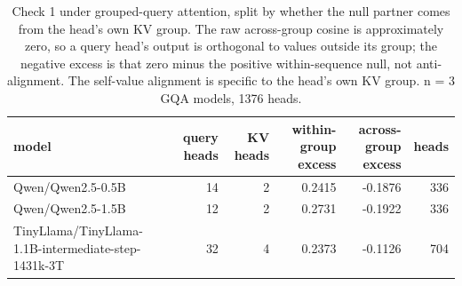 \begin{table}[t]
  \centering
  \caption{Check 1 under grouped-query attention, split by whether the null partner comes from the head's own KV group. The raw across-group cosine is approximately zero, so a query head's output is orthogonal to values outside its group; the negative excess is that zero minus the positive within-sequence null, not anti-alignment. The self-value alignment is specific to the head's own KV group. n = 3 GQA models, 1376 heads.}
  \label{tab:t2}
  \begin{tabular}{lrrrrr}
    \toprule
    model & query heads & KV heads & within-group excess & across-group excess & heads \\
    \midrule
    Qwen/Qwen2.5-0.5B & 14 & 2 & 0.2415 & -0.1876 & 336 \\
    Qwen/Qwen2.5-1.5B & 12 & 2 & 0.2731 & -0.1922 & 336 \\
    TinyLlama/TinyLlama-1.1B-intermediate-step-1431k-3T & 32 & 4 & 0.2373 & -0.1126 & 704 \\
    \bottomrule
  \end{tabular}
\end{table}
